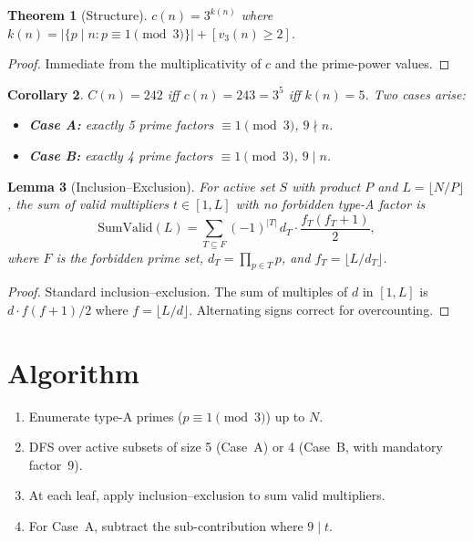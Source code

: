 \documentclass[12pt]{article}
\newtheorem{theorem}{Theorem}
\newtheorem{lemma}[theorem]{Lemma}
\newtheorem{corollary}[theorem]{Corollary}
\begin{document}
\begin{theorem}[Structure]
$c(n) = 3^{k(n)}$ where $k(n) = |\{p \mid n : p \equiv 1 \pmod{3}\}| + [v_3(n) \ge 2]$.
\end{theorem}

\begin{proof}
Immediate from the multiplicativity of $c$ and the prime-power values.
\end{proof}

\begin{corollary}
$C(n) = 242$ iff $c(n) = 243 = 3^5$ iff $k(n) = 5$. Two cases arise:
\begin{itemize}
    \item \textbf{Case A:} exactly 5 prime factors $\equiv 1\pmod{3}$, $9 \nmid n$.
    \item \textbf{Case B:} exactly 4 prime factors $\equiv 1\pmod{3}$, $9 \mid n$.
\end{itemize}
\end{corollary}

\begin{lemma}[Inclusion--Exclusion]
For active set $S$ with product $P$ and $L = \lfloor N/P \rfloor$, the sum of valid multipliers $t \in [1,L]$ with no forbidden type-A factor is
\[
\mathrm{SumValid}(L) = \sum_{T \subseteq F} (-1)^{|T|}\, d_T \cdot \frac{f_T(f_T+1)}{2},
\]
where $F$ is the forbidden prime set, $d_T = \prod_{p\in T} p$, and $f_T = \lfloor L/d_T \rfloor$.
\end{lemma}

\begin{proof}
Standard inclusion--exclusion. The sum of multiples of $d$ in $[1,L]$ is $d \cdot f(f+1)/2$ where $f = \lfloor L/d \rfloor$. Alternating signs correct for overcounting.
\end{proof}

\section{Algorithm}
\begin{enumerate}
    \item Enumerate type-A primes ($p \equiv 1 \pmod{3}$) up to $N$.
    \item DFS over active subsets of size 5 (Case~A) or 4 (Case~B, with mandatory factor~9).
    \item At each leaf, apply inclusion--exclusion to sum valid multipliers.
    \item For Case~A, subtract the sub-contribution where $9 \mid t$.
\end{enumerate}
\end{document}
